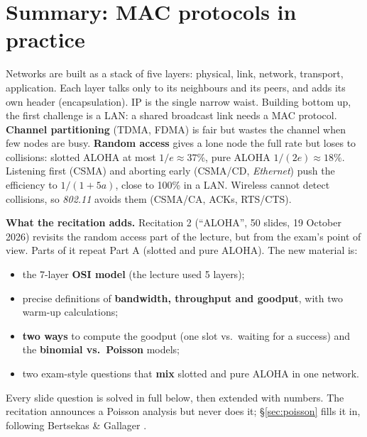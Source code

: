 \section{Summary: MAC protocols in practice}

\begin{intuition}
Networks are built as a stack of five layers: physical, link, network, transport, application. Each layer talks only to its neighbours and its peers, and adds
its own header (encapsulation). IP is the single narrow waist. Building bottom up, the first challenge is a LAN: a shared broadcast link needs a MAC protocol.
\textbf{Channel partitioning} (TDMA, FDMA) is fair but wastes the channel when few nodes are busy. \textbf{Random access} gives a lone node the full rate but loses
to collisions: slotted ALOHA at most $1/e\approx37\%$, pure ALOHA $1/(2e)\approx18\%$. Listening first (CSMA) and aborting early (CSMA/CD, \emph{Ethernet}) push the
efficiency to $1/(1+5a)$, close to 100\% in a LAN. Wireless cannot detect collisions, so \emph{802.11} avoids them (CSMA/CA, ACKs, RTS/CTS).
\end{intuition}


\begin{plainbox}
\textbf{What the recitation adds.} Recitation 2 (``ALOHA'', 50 slides, 19 October 2026) revisits the random access part of the lecture, but from the
exam's point of view. Parts of it repeat Part A (slotted and pure ALOHA). The new material is:
\begin{itemize}
  \item the 7-layer \textbf{OSI model} (the lecture used 5 layers);
  \item precise definitions of \textbf{bandwidth, throughput and goodput}, with two warm-up calculations;
  \item \textbf{two ways} to compute the goodput (one slot vs.\ waiting for a success) and the \textbf{binomial vs.\ Poisson} models;
  \item two exam-style questions that \textbf{mix} slotted and pure ALOHA in one network.
\end{itemize}
Every slide question is solved in full below, then extended with numbers. The recitation announces a Poisson analysis but never does it; \S\ref{sec:poisson} fills it in,
following Bertsekas \& Gallager .
\end{plainbox}

